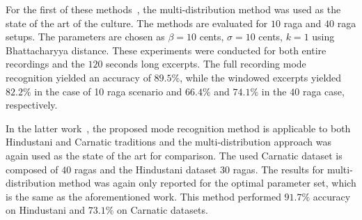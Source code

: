\documentclass{sig-alternate}
\begin{document}
For the first of these methods~\cite{gulati2016raga}, the multi-distribution method was used as the state of the art of the culture. The methods are evaluated for $10$ raga and $40$ raga setups. The parameters are chosen as $\beta = 10$ cents, $\sigma = 10$ cents, $k = 1$ using Bhattacharyya distance. These experiments were conducted for both entire recordings and the $120$ seconds long excerpts. The full recording mode recognition yielded an accuracy of $89.5\%$, while the windowed excerpts yielded $82.2\%$ in the case of 10 raga scenario and $66.4\%$ and $74.1\%$ in the $40$ raga case, respectively.

In the latter work~\cite{gulati_network}, the proposed mode recognition method is applicable to both Hindustani and Carnatic traditions and the multi-distribution approach was again used as the state of the art for comparison. The used Carnatic dataset is composed of $40$ ragas and the Hindustani dataset $30$ ragas. The results for multi-distribution method was again only reported for the optimal parameter set, which is the same as the aforementioned work. This method performed $91.7\%$ accuracy on Hindustani and $73.1\%$ on Carnatic datasets.

\end{document}
